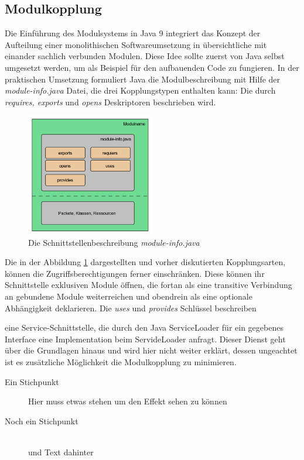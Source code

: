   \subsection{Modulkopplung}
    Die Einführung des Modulsystems in Java 9 integriert das Konzept der Aufteilung einer monolithischen Softwareumsetzung in übersichtliche mit einander sachlich verbunden Modulen. 
    Diese Idee sollte zuerst von Java selbst umgesetzt werden, um als Beispiel für den aufbauenden Code zu fungieren.
    In der praktischen Umsetzung formuliert Java die Modulbeschreibung mit Hilfe der \textit{module-info.java} Datei, die drei Kopplungstypen enthalten kann: Die durch \textit{requires, exports} und \textit{opens} Deskriptoren beschrieben wird.
    \begin{figure}[h!]
      \centering
      \includegraphics[width=0.5\textwidth]{material/images/module-info.png}
      \caption{Die Schnittstellenbeschreibung \textit{module-info.java}}
      \label{fig:module-info}
    \end{figure}
    \newline Die in der Abbildung \ref{fig:module-info} dargestellten und vorher diskutierten Kopplungsarten, können die Zugriffsberechtigungen ferner einschränken.
    Diese können ihr Schnittstelle exklusiven Module öffnen, die fortan als eine transitive Verbindung an gebundene Module weiterreichen und obendrein als eine optionale Abhängigkeit deklarieren.
    Die \textit{uses} und \textit{provides} Schlüssel beschreiben 

    eine Service-Schnittstelle, die durch den Java ServiceLoader für ein gegebenes Interface eine Implementation beim ServideLoader anfragt.    
    Dieser Dienst geht über die Grundlagen hinaus und wird hier nicht weiter erklärt, dessen ungeachtet ist es zusätzliche Möglichkeit die Modulkopplung zu minimieren. 
    \begin{description}
      \item[Ein Stichpunkt]\hfill 
      \newline Hier muss etwas stehen um den Effekt sehen zu k{\"o}nnen
      \item[Noch ein Stichpunkt]\hfill \\ und Text dahinter 
    \end{description}

